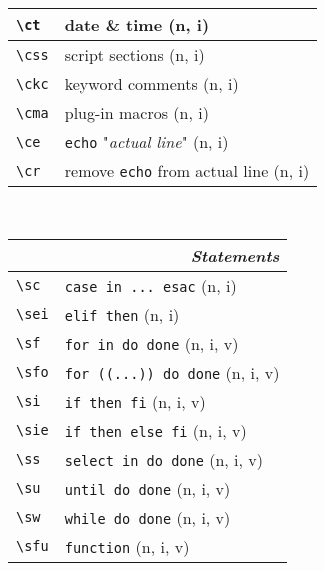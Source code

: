 \documentclass[oneside,11pt,landscape,DIV16]{scrartcl}
\begin{document}
\begin{multicols}{3}
\begin{center}
\begin{tabular}[]{|p{11mm}|p{60mm}|}
\hline     \verb'\ct'   & date \& time                      \hfill (n, i)\\
\hline     \verb'\css'  & script sections                   \hfill (n, i)\\
\hline     \verb'\ckc'  & keyword comments                  \hfill (n, i)\\
\hline     \verb'\cma'  & plug-in macros                    \hfill (n, i)\\
%
\hline     \verb'\ce'   & \texttt{echo} "\textsl{actual line}"  \hfill (n, i)\\
\hline     \verb'\cr'   & remove \texttt{echo} from actual line \hfill (n, i)\\
\hline
\end{tabular}\\
%
%
\begin{tabular}[]{|p{11mm}|p{60mm}|}
\hline
\multicolumn{2}{|r|}{\textsl{\textbf{S}tatements}}                    \\[1.0ex]
\hline \verb'\sc'  & \verb'case in ... esac'               \hfill (n, i)\\
\hline \verb'\sei' & \verb'elif then'                      \hfill (n, i)\\
\hline \verb'\sf'  & \verb'for in do done'                 \hfill (n, i, v)\\
\hline \verb'\sfo' & \verb'for ((...)) do done'            \hfill (n, i, v)\\
\hline \verb'\si'  & \verb'if then fi'                     \hfill (n, i, v)\\
\hline \verb'\sie' & \verb'if then else fi'                \hfill (n, i, v)\\
\hline \verb'\ss'  & \verb'select in do done'              \hfill (n, i, v)\\
\hline \verb'\su'  & \verb'until do done'                  \hfill (n, i, v)\\
\hline \verb'\sw'  & \verb'while do done'                  \hfill (n, i, v)\\
\hline \verb'\sfu' & \verb'function'                       \hfill (n, i, v)\\

\end{tabular}
\end{center}
\end{multicols}
\end{document}
